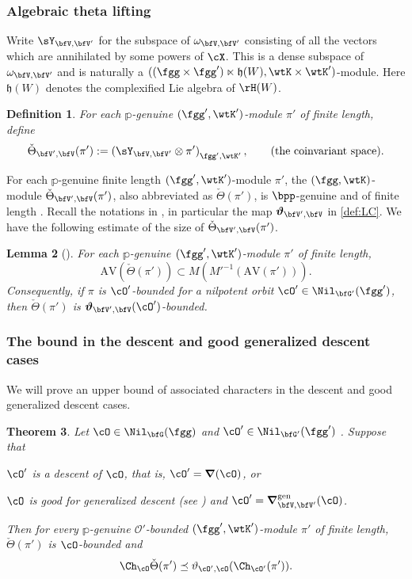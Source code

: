 \documentclass[12pt,a4paper]{amsart}
\newcommand{\AV}{\mathrm{AV}}
\newcommand{\CO}{{\mathcal {O}}}
\newcommand{\h}{\mathfrak h}
\def\DDc{\boldsymbol{\nabla}}
\def\gDDc{\boldsymbol{\nabla}^{\mathrm{gen}}}
\numberwithin{equation}{section}
\newtheorem{thm}{Theorem}[section]
\newtheorem{lem}[thm]{Lemma}
\newtheorem{defn}[thm]{Definition}
\theoremstyle{remark}
\def\NilGC{\Nil_{\bfG}(\fgg)}
\def\NilGCp{\Nil_{\bfG'}(\fgg')}
\def\dliftv{\vartheta}
\def\Thetav{\check{\Theta}}
\def\Thetav{\check{\Theta}}
\begin{document}
\subsubsection{Algebraic theta lifting}\label{sec:ATL}
 Write
$
  \sY_{\bfV,\bfV'}
  $ for the subspace of $\omega_{\bfV,\bfV'}$ consisting of all the vectors which are annihilated by some powers of $\cX$. This is a dense subspace of $\omega_{\bfV,\bfV'}$ and is naturally  a $((\fgg\times \fgg')\ltimes \h(W), \wtK\times \wtK')$-module. Here $\h(W)$ denotes the complexified Lie algebra of $\rH(W)$.

  \begin{defn}
For each $\mathbb p$-genuine $(\fgg',\wtK')$-module $\pi'$ of finite length,
define
\[
  \Thetav_{\bfV',\bfV}(\pi'):= \left(\sY_{\bfV,\bfV'}\otimes \pi' \right)_{\fgg', \wtK'},\qquad
  \text{(the coinvariant space).}
\]
\end{defn}

For each $\mathbb p$-genuine finite length $(\fgg',\wtK')$-module $\pi'$,
the $(\fgg,\wtK)$-module
$\Thetav_{\bfV',\bfV}(\pi')$, also abbreviated as $\Thetav(\pi')$,
is $\bpp$-genuine and of finite length \cite{Howe89}.
Recall the
notations in ,
in particular the map $\oliftc_{\bfV',\bfV}$ in
\cref{def:LC}.
We have the following estimate of the size of
$\Thetav_{\bfV',\bfV}(\pi')$.

\begin{lem}[{\cite[Theorem~B and Corollary~E]{LM}}]\label{cor:Cbound}
For each $\mathbb p$-genuine $(\fgg',\wtK')$-module $\pi'$ of finite length,
\[
\AV(\Thetav(\pi')) \subset M(M'^{-1}(\AV(\pi'))).
\]
Consequently, if $\pi$ is $\cO'$-bounded for a nilpotent
orbit $\cO'\in \Nil_{\bfG'}(\fgg')$, then $\Thetav(\pi')$ is
$\oliftc_{\bfV',\bfV}(\cO')$-bounded.
\end{lem}


\subsubsection{The bound in the descent and good generalized descent cases}\label{sec:EAC}
We will prove an upper bound of associated characters in the descent and good
generalized descent cases. %

\begin{thm}\label{prop:GDS.AC}
  Let $\cO\in \NilGC$ and $\cO'\in \NilGCp$ .  Suppose that
  \begin{enumC}
  \item \label{it:case.D} $\cO'$ is a descent of $\cO$, that is,  $\cO' = \DDc(\cO)$, or
  \item \label{it:case.GD} $\cO$ is good for generalized descent (see ) and $\cO' = \gDDc_{\bfV,\bfV'}(\cO)$.
  \end{enumC}
  Then for every $\mathbb p$-genuine $\CO'$-bounded $(\fgg',\wtK')$-module $\pi'$ of finite length,  $\Thetav(\pi')$ is $\cO$-bounded and
  \[
    \Ch_{\cO}\Thetav(\pi')\preceq \dliftv_{\cO',\cO}(\Ch_{\cO'}(\pi')).
  \]
\end{thm}
\end{document}
